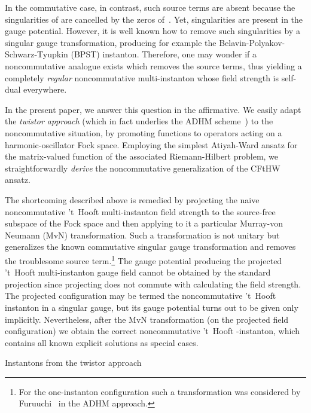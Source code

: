 \documentclass[a4paper,11pt]{article}
\makeatletter
\renewcommand{\section}{\@startsection{section}{1}{0pt}{\medskipamount}
{\medskipamount}{\large\bf}}
\numberwithin{equation}{section}
\makeatother
\begin{document}
In the commutative case, in contrast, such source terms are absent because
the singularities of \myHighlight{$\Box\phi$}\coordHE{} are cancelled by the zeros of~\coordHE{}.
Yet, singularities are present in the gauge potential.
However, it is well known how to remove such singularities by a
singular gauge transformation, producing for example the
Belavin-Polyakov-Schwarz-Tyupkin (BPST) instanton.
Therefore, one may wonder if a noncommutative analogue exists
which removes the source terms, thus yielding a completely {\it regular\/} 
noncommutative multi-instanton whose field strength is self-dual everywhere.

In the present paper, we answer this question in the affirmative.
We easily adapt the {\it twistor approach\/} 
(which in fact underlies the ADHM scheme~\cite{Atiyah:1978ri}) 
to the noncommutative situation,
by promoting functions to operators acting on a harmonic-oscillator Fock space.
Employing the simplest Atiyah-Ward ansatz for the matrix-valued function of the
associated Riemann-Hilbert problem, we straightforwardly {\it derive\/} the 
noncommutative generalization of the CFtHW ansatz. 

The shortcoming described above is remedied by projecting the naive 
noncommutative 't~Hooft multi-instanton field strength to the source-free 
subspace of the Fock space and then applying to it a particular Murray-von 
Neumann (MvN) transformation. Such a transformation is not unitary 
but generalizes the known commutative singular gauge transformation
and removes the troublesome source term.\footnote{
For the one-instanton configuration such a transformation was considered
by Furuuchi~\cite{Furuuchi:2001vx} in the ADHM approach.}
The gauge potential producing the projected 't~Hooft multi-instanton gauge
field cannot be obtained by the standard projection since projecting does not
commute with calculating the field strength.
The projected configuration may be termed the noncommutative 't~Hooft 
instanton in a singular gauge, but its gauge potential turns out to be
given only implicitly. Nevertheless, after the MvN transformation (on the 
projected field configuration) we obtain the correct noncommutative 
't~Hooft \coordHE{}-instanton, which contains all known explicit solutions as 
special cases.


\section{Instantons from the twistor approach}
\end{document}
